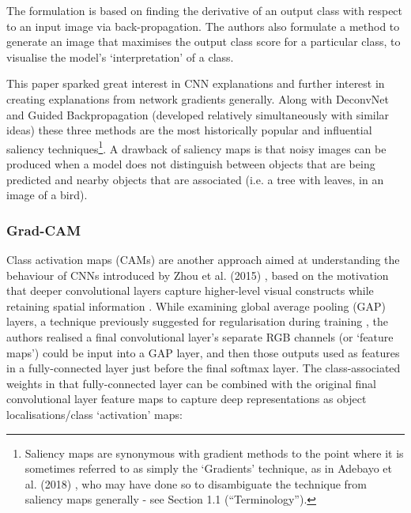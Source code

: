 \documentclass[main]{subfiles}
\begin{document}
The formulation is based on finding the derivative of an output class with respect to an input image via back-propagation. The authors also formulate a method to generate an image that maximises the output class score for a particular class, to visualise the model's `interpretation' of a class. 



This paper sparked great interest in CNN explanations and further interest in creating explanations from network gradients generally. Along with DeconvNet and Guided Backpropagation (developed relatively simultaneously with similar ideas) these three methods are the most historically popular and influential saliency techniques\footnote{Saliency maps are synonymous with gradient methods to the point where it is sometimes referred to as simply the `Gradients' technique, as in Adebayo et al. (2018) \cite{sanity}, who may have done so to disambiguate the technique from saliency maps generally - see Section 1.1 (``Terminology'').}. A drawback of saliency maps is that noisy images can be produced when a model does not distinguish between objects that are being predicted and nearby objects that are associated (i.e. a tree with leaves, in an image of a bird).

\subsubsection{Grad-CAM}
Class activation maps (CAMs) are another approach aimed at understanding the behaviour of CNNs introduced by Zhou et al. (2015) \cite{cam}, based on the motivation that deeper convolutional layers capture higher-level visual constructs while retaining spatial information \cite{gradcam}. While examining global average pooling (GAP) layers, a technique previously suggested for regularisation during training \cite{nin}, the authors realised a final convolutional layer's separate RGB channels (or `feature maps') could be input into a GAP layer, and then those outputs used as features in a fully-connected layer just before the final softmax layer. The class-associated weights in that fully-connected layer can be combined with the original final convolutional layer feature maps to capture deep representations as object localisations/class `activation' maps:
\end{document}
